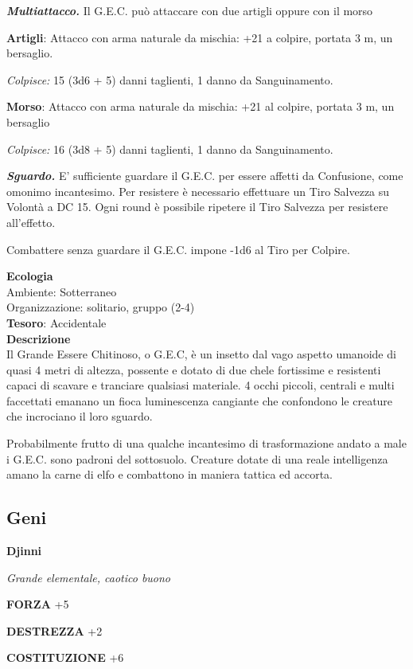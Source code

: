 \begin{multicols}{2}
\textit{\textbf{Multiattacco.}} Il G.E.C. può attaccare con due artigli oppure con il morso

\textbf{Artigli}: Attacco con arma naturale da mischia: +21 a colpire, portata 3 m, un bersaglio.

\textit{Colpisce:} 15 (3d6 + 5) danni taglienti, 1 danno da Sanguinamento.

\textbf{Morso}: Attacco con arma naturale da mischia: +21 al colpire, portata 3 m, un bersaglio

\textit{Colpisce:} 16 (3d8 + 5) danni taglienti, 1 danno da Sanguinamento.

\textit{\textbf{Sguardo.}} E' sufficiente guardare il G.E.C. per essere affetti da Confusione, come omonimo incantesimo. Per resistere è necessario effettuare un Tiro Salvezza su Volontà a DC 15. Ogni round è possibile ripetere il Tiro Salvezza per resistere all'effetto.

Combattere senza guardare il G.E.C. impone -1d6 al Tiro per Colpire.

\textbf{Ecologia}\\
Ambiente: Sotterraneo\\
Organizzazione: solitario, gruppo (2-4) \\
\textbf{Tesoro}: Accidentale\\
\textbf{Descrizione}\\
Il Grande Essere Chitinoso, o G.E.C, è un insetto dal vago aspetto umanoide di quasi 4 metri di altezza, possente e dotato di due chele fortissime e resistenti capaci di scavare e tranciare qualsiasi materiale. 4 occhi piccoli, centrali e multi faccettati emanano un fioca luminescenza cangiante che confondono le creature che incrociano il loro sguardo.

Probabilmente frutto di una qualche incantesimo di trasformazione andato a male i G.E.C. sono padroni del sottosuolo. Creature dotate di una reale intelligenza amano la carne di elfo e combattono in maniera tattica ed accorta.

\subsection{Geni}

\medskip{}\textbf{Djinni}

\textit{Grande elementale, caotico buono}

\textbf{FORZA} +5

\textbf{DESTREZZA} +2

\textbf{COSTITUZIONE} +6


\end{multicols}
